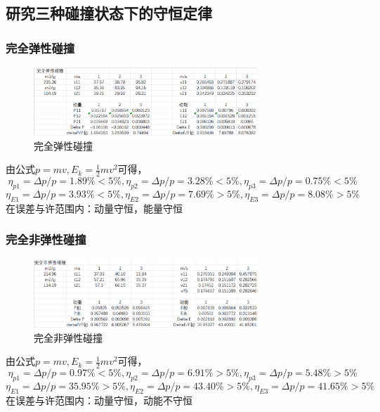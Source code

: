 \documentclass[12pt,a4paper]{article}
\begin{document}
	  	\subsection{研究三种碰撞状态下的守恒定律}

			\subsubsection{完全弹性碰撞}
				\begin{figure}[H]
					\centering
					\includegraphics[width=0.75\textwidth]{完全弹性碰撞.png}
					\caption{完全弹性碰撞}
					\label{fig:数据}
	  			\end{figure}
				由公式$p=mv,E_k=\frac{1}{2} m v^2$可得，
				$$\eta_{p1}=\Delta p/p=1.89\%<5\%,\eta_{p2}=\Delta p/p=3.28\%<5\%,\eta_{p3}=\Delta p/p=0.75\%<5\%$$
				$$\eta_{E1}=\Delta p/p=3.93\%<5\%,\eta_{E2}=\Delta p/p=7.69\%>5\%,\eta_{E3}=\Delta p/p=8.08\%>5\%$$
				在误差与许范围内：动量守恒，能量守恒

			\subsubsection{完全非弹性碰撞}
				\begin{figure}[H]
					\centering
					\includegraphics[width=0.75\textwidth]{完全非弹性碰撞.png}
					\caption{完全非弹性碰撞}
					\label{fig:数据}
	  			\end{figure}
				由公式$p=mv,E_k=\frac{1}{2} m v^2$可得，
				$$\eta_{p1}=\Delta p/p=0.97\%<5\%,\eta_{p2}=\Delta p/p=6.91\%>5\%,\eta_{p3}=\Delta p/p=5.48\%>5\%$$
				$$\eta_{E1}=\Delta p/p=35.95\%>5\%,\eta_{E2}=\Delta p/p=43.40\%>5\%,\eta_{E3}=\Delta p/p=41.65\%>5\%$$
				在误差与许范围内：动量守恒，动能不守恒
\end{document}
